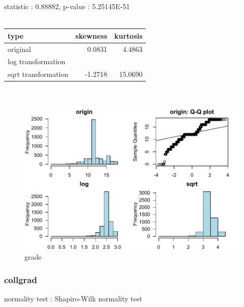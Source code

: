 \documentclass{book}\usepackage[]{graphicx}\usepackage[]{color}
\begin{document}
\noindent statistic : 0.88882,  p-value : 5.25145E-51\\
\\%
\begin{tabular}{lrr}
  \toprule
type & skewness & kurtosis \\ 
  \midrule
original & 0.0831 & 4.4863 \\ 
  log transformation &  &  \\ 
  sqrt transformation & -1.2718 & 15.0690 \\ 
   \bottomrule
\end{tabular}
\\
\begin{figure}[!ht]
\centering
\includegraphics[width=1.0\textwidth]{figure/norm8.pdf}
\caption{grade}
\end{figure}
\clearpage
\subsubsection{ collgrad }

normality test : Shapiro-Wilk normality test
\end{document}
